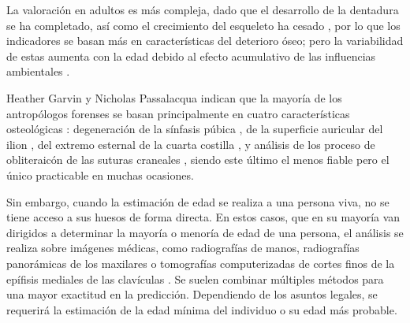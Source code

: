 La valoración en adultos es más compleja, dado que el desarrollo de la dentadura se ha completado, 
así como el crecimiento del esqueleto ha cesado \cite[cap. 9]{byers2023}, por lo que los indicadores 
se basan más en características del deterioro óseo; pero la variabilidad de estas aumenta con la 
edad debido al efecto acumulativo de las influencias ambientales \cite{ubeleaker2018, scheuer2004}.


Heather Garvin y Nicholas Passalacqua \cite{garvin2012} indican que la mayoría de los 
antropólogos forenses se basan principalmente en cuatro características osteológicas : 
degeneración de la sínfasis púbica \cite{alsalihi2002}, 
de la superficie auricular del ilion \cite{lovejoy1985}, 
del extremo esternal de la cuarta costilla \cite{iscan1984}, 
y análisis de los proceso de obliteraicón de las suturas craneales \cite{meindl1985},
siendo este último el menos fiable pero el único practicable en muchas ocasiones.


Sin embargo, cuando la estimación de edad se realiza a una persona viva, no se tiene acceso a sus 
huesos de forma directa. En estos casos, que en su mayoría van dirigidos a determinar la mayoría o menoría de edad
de una persona, el análisis se realiza sobre imágenes médicas, como radiografías de manos, radiografías panorámicas
de los maxilares o tomografías computerizadas de cortes finos de la epífisis mediales de las clavículas 
\cite{schmeling2016}. Se suelen combinar múltiples métodos para una mayor exactitud en la predicción. Dependiendo de 
los asuntos legales, se requerirá la estimación de la edad mínima del individuo o su edad más probable.






